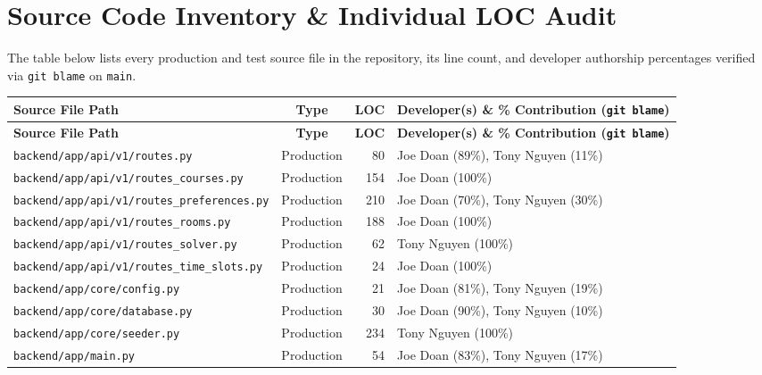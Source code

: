 \documentclass[10pt,letterpaper]{article}
\begin{document}
\section{Source Code Inventory \& Individual LOC Audit}
The table below lists every production and test source file in the repository, its line count, and developer authorship percentages verified via \texttt{git blame} on \texttt{main}.

\footnotesize
\renewcommand{\arraystretch}{1.12}
\begin{longtable}{|p{7.1cm}|c|r|p{6.2cm}|}
\hline
\rowcolor{tableheader}
\textbf{\sffamily Source File Path} & \textbf{\sffamily Type} & \textbf{\sffamily LOC} & \textbf{\sffamily Developer(s) \& \% Contribution (\texttt{git blame})} \\ \hline
\endfirsthead
\hline
\rowcolor{tableheader}
\textbf{\sffamily Source File Path} & \textbf{\sffamily Type} & \textbf{\sffamily LOC} & \textbf{\sffamily Developer(s) \& \% Contribution (\texttt{git blame})} \\ \hline
\endhead
\texttt{backend/app/api/v1/routes.py} & Production & 80 & Joe Doan (89\%), Tony Nguyen (11\%) \\ \hline
\texttt{backend/app/api/v1/routes\_courses.py} & Production & 154 & Joe Doan (100\%) \\ \hline
\texttt{backend/app/api/v1/routes\_preferences.py} & Production & 210 & Joe Doan (70\%), Tony Nguyen (30\%) \\ \hline
\texttt{backend/app/api/v1/routes\_rooms.py} & Production & 188 & Joe Doan (100\%) \\ \hline
\texttt{backend/app/api/v1/routes\_solver.py} & Production & 62 & Tony Nguyen (100\%) \\ \hline
\texttt{backend/app/api/v1/routes\_time\_slots.py} & Production & 24 & Joe Doan (100\%) \\ \hline
\texttt{backend/app/core/config.py} & Production & 21 & Joe Doan (81\%), Tony Nguyen (19\%) \\ \hline
\texttt{backend/app/core/database.py} & Production & 30 & Joe Doan (90\%), Tony Nguyen (10\%) \\ \hline
\texttt{backend/app/core/seeder.py} & Production & 234 & Tony Nguyen (100\%) \\ \hline
\texttt{backend/app/main.py} & Production & 54 & Joe Doan (83\%), Tony Nguyen (17\%) \\ \hline

\end{longtable}
\end{document}
